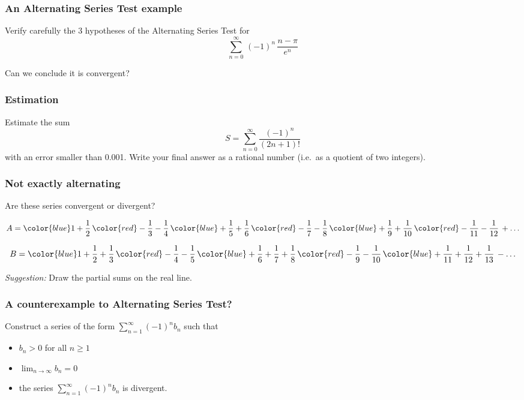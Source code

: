 \begin{frame}[t]
	\frametitle{ An Alternating Series Test example}

	Verify carefully the 3 hypotheses of the Alternating Series Test for
	\[
		\sum_{n=0}^{\infty}\, (-1)^{n}\, \frac{n - \pi}{e^{n}}
	\]

	Can we conclude it is convergent?
\end{frame}

\begin{frame}[t]
	\frametitle{Estimation}

	Estimate the sum
	\[
		S = \sum_{n=0}^{\infty}\frac{(-1)^{n}}{(2n+1)!}
	\]
	with an error smaller than 0.001. Write your final answer as a rational number
	(i.e.\ as a quotient of two integers).
\end{frame}

\begin{frame}[t]
	\fontsize{13}{13}\selectfont
	\frametitle{Not exactly alternating}

	Are these series convergent or divergent?

	\[
		A ={\color{blue} 1 + \frac{1}{2}}\,{\color{red} - \frac{1}{3} - \frac{1}{4}}\,
		{\color{blue} + \frac{1}{5} + \frac{1}{6}}\,{\color{red} - \frac{1}{7} - \frac{1}{8}}
		\,{\color{blue} + \frac{1}{9} + \frac{1}{10}}\,{\color{red} - \frac{1}{11} - \frac{1}{12}}
		\, + \ldots
	\]

	\[
		B ={\color{blue} 1 + \frac{1}{2} + \frac{1}{3}}\,{\color{red} - \frac{1}{4} - \frac{1}{5}}
		\,{\color{blue} + \frac{1}{6} + \frac{1}{7} + \frac{1}{8}}\,{\color{red} - \frac{1}{9} - \frac{1}{10}}
		\,{\color{blue} + \frac{1}{11} + \frac{1}{12} + \frac{1}{13}}\, - \ldots
	\]
	\vspace{.2cm}

	\emph{Suggestion:} Draw the partial sums on the real line.
\end{frame}

\begin{frame}[t]
	\frametitle{A counterexample to Alternating Series Test?}

	Construct a series of the form
	$\displaystyle \sum_{n=1}^{\infty}(-1)^{n}b_{n}$ such that
	\begin{itemize}
		\item $\displaystyle b_{n}>0$ for all $n \geq 1$
			\vspace{.4cm}

		\item $\displaystyle \lim_{n \to \infty}b_{n}= 0$

		\item the series $\displaystyle \sum_{n=1}^{\infty}(-1)^{n}b_{n}$ is divergent.
	\end{itemize}
\end{frame}

